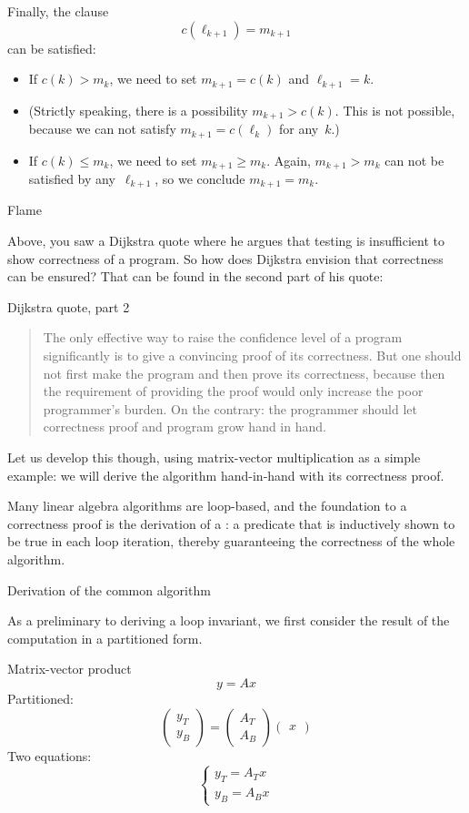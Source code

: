 Finally, the clause \[ c(\ell_{k+1})=m_{k+1} \]
can be satisfied:
\begin{itemize}
\item If $c(k)>m_k$, we need to set $m_{k+1}=c(k)$ and $\ell_{k+1}=k$.
\item (Strictly speaking, there is a possibility 
  $m_{k+1}>c(k)$. This is not possible, because we
  can not satisfy $m_{k+1}=c(\ell_k)$ for any~$k$.)
\item If $c(k)\leq m_k$, we need to set $m_{k+1}\geq m_k$.
  Again, $m_{k+1}>m_k$ can not be satisfied by any~$\ell_{k+1}$,
  so we conclude $m_{k+1}=m_k$.
\end{itemize}

 {Flame}

Above, you saw a Dijkstra quote where he argues that testing is
insufficient to show correctness of a program.
So how does Dijkstra envision that correctness can be ensured?
That can be found in the second part of his quote:

\begin{block}{Dijkstra quote, part 2}
  \begin{quotation}
    The only effective way to raise the confidence level of a
    program significantly is to give a convincing proof of its
    correctness. But one should not first make the program and then
    prove its correctness, because then the requirement of providing
    the proof would only increase the poor programmer’s burden. On the
    contrary: the programmer should let correctness proof and program
    grow hand in hand.
  \end{quotation}
\end{block}

Let us develop this though, using matrix-vector multiplication
as a simple example:
we will derive the algorithm hand-in-hand with its correctness proof.

Many linear algebra algorithms are loop-based, and the foundation
to a correctness proof is the derivation of a :
a predicate that is inductively shown to be true in each loop iteration,
thereby guaranteeing the correctness of the whole algorithm.

 {Derivation of the common algorithm}

As a preliminary to deriving a loop invariant, we first consider
the result of the computation in a partitioned form.

\begin{block}{Matrix-vector product}
  \[ y = Ax \]
  Partitioned:
  \[
  \begin{pmatrix}
    y_T\\ y_B
  \end{pmatrix}
  =
  \begin{pmatrix}
    A_T\\ A_B
  \end{pmatrix}
  \begin{pmatrix}
    x 
  \end{pmatrix}
  \]
  Two equations:
  \[
  \begin{cases}
    y_T = A_T x\\ y_B = A_B x
  \end{cases}
  \]
\end{block}

